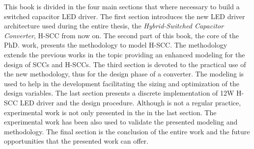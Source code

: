 This book is divided in the four main sections that where necessary to build a switched capacitor LED driver. The first section introduces the new LED driver architecture used during the entire thesis, the \emph{Hybrid-Switched Capacitor Converter}, H-SCC from now on. The second part of this book, the core of the PhD. work, presents the methodology to model H-SCC. The methodology extends the previous works in the topic providing an enhanced modeling for the design of SCCs and H-SCCs. The third section is devoted to the practical use of the new methodology, thus for the design phase of a converter. The modeling is used  to help in the development facilitating the sizing and optimization of the design variables. The last section presents a discrete implementation of 12W H-SCC LED driver and the design procedure. Although is not a regular practice, experimental work is not only presented in the in the last section. The experimental work has been also  used to validate the presented modeling and methodology. The final section is the conclusion of the entire work and the future opportunities that the presented work can offer.
